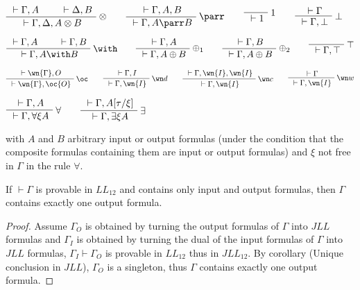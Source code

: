 \(\AxRule{{}\vdash\Gamma,A}
\AxRule{{}\vdash\Delta,B}
\LabelRule{\tens}
\BinRule{{}\vdash\Gamma,\Delta,A\tens B}
\DisplayProof
\qquad
\AxRule{{}\vdash\Gamma,A,B}
\LabelRule{\parr}
\UnaRule{{}\vdash\Gamma,A\parr B}
\DisplayProof
\qquad
\LabelRule{\one}
\NulRule{{}\vdash\one}
\DisplayProof
\qquad
\AxRule{{}\vdash\Gamma}
\LabelRule{\bot}
\UnaRule{{}\vdash\Gamma,\bot}
\DisplayProof\)

\(\AxRule{{}\vdash\Gamma,A}
\AxRule{{}\vdash\Gamma,B}
\LabelRule{\with}
\BinRule{{}\vdash\Gamma,A\with B}
\DisplayProof
\qquad
\AxRule{{}\vdash\Gamma,A}
\LabelRule{\plus_1}
\UnaRule{{}\vdash\Gamma,A\plus B}
\DisplayProof
\qquad
\AxRule{{}\vdash\Gamma,B}
\LabelRule{\plus_2}
\UnaRule{{}\vdash\Gamma,A\plus B}
\DisplayProof
\qquad
\LabelRule{\top}
\NulRule{{}\vdash\Gamma,\top}
\DisplayProof\)

\(\AxRule{{}\vdash\wn{\Gamma},O}
\LabelRule{\oc}
\UnaRule{{}\vdash\wn{\Gamma},\oc{O}}
\DisplayProof
\qquad
\AxRule{{}\vdash\Gamma,I}
\LabelRule{\wn d}
\UnaRule{{}\vdash\Gamma,\wn{I}}
\DisplayProof
\qquad
\AxRule{{}\vdash\Gamma,\wn{I},\wn{I}}
\LabelRule{\wn c}
\UnaRule{{}\vdash\Gamma,\wn{I}}
\DisplayProof
\qquad
\AxRule{{}\vdash\Gamma}
\LabelRule{\wn w}
\UnaRule{{}\vdash\Gamma,\wn{I}}
\DisplayProof\)

\(\AxRule{{}\vdash\Gamma,A}
\LabelRule{\forall}
\UnaRule{{}\vdash\Gamma,\forall\xi A}
\DisplayProof
\qquad
\AxRule{{}\vdash\Gamma,A[\tau/\xi]}
\LabelRule{\exists}
\UnaRule{{}\vdash\Gamma,\exists\xi A}
\DisplayProof\)

with \(A\) and \(B\) arbitrary input or output formulas (under the
condition that the composite formulas containing them are input or
output formulas) and \(\xi\) not free in \(\Gamma\) in the rule
\(\forall\).

\begin{lemma}
If ${}\vdash\Gamma$ is provable in $LL_{12}$ and contains only input and output formulas, then $\Gamma$ contains exactly one output formula.
\end{lemma}

\begin{proof}
Assume $\Gamma_O$ is obtained by turning the output formulas of $\Gamma$ into $JLL$ formulas and $\Gamma_I$ is obtained by turning the dual of the input formulas of $\Gamma$ into $JLL$ formulas, $\Gamma_I\vdash\Gamma_O$ is provable in $LL_{12}$ thus in $JLL_{12}$. By corollary (Unique conclusion in $JLL$), $\Gamma_O$ is a singleton, thus $\Gamma$ contains exactly one output formula.
\end{proof}


